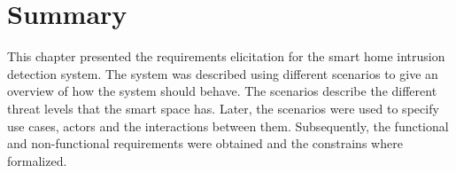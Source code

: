 \section{Summary}
This chapter presented the requirements elicitation for the smart home intrusion detection system. The system was described using different scenarios to give an overview of how the system should behave. The scenarios describe the different threat levels that the smart space has. Later, the scenarios were used to specify use cases, actors and the interactions between them. Subsequently, the functional and non-functional requirements were obtained and the constrains where formalized. 
